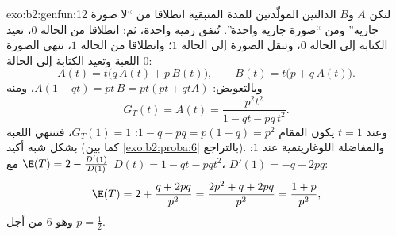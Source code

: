 \begin{solution}{exo:b2:genfun:12}
لتكن $A$ و$B$ الدالتين المولّدتين للمدة المتبقية انطلاقا من
``لا صورة جارية'' ومن ``صورة جارية واحدة''. تُنفق رمية واحدة، ثم:
انطلاقا من الحالة $0$، تعيد الكتابة إلى الحالة $0$، وتنقل
الصورة إلى الحالة $1$؛ وانطلاقا من الحالة $1$، تنهي الصورة
اللعبة وتعيد الكتابة إلى الحالة $0$:
\[
A(t) = t\bigl(q\,A(t) + p\,B(t)\bigr),
\qquad
B(t) = t\bigl(p + q\,A(t)\bigr).
\]
وبالتعويض: $A(1 - qt) = pt\,B = pt(pt + qtA)$، ومنه
\[
G_T(t) = A(t) = \frac{p^2t^2}{1 - qt - pq\,t^2} .
\]
وعند $t = 1$ يكون المقام $1 - q - pq = p(1 - q) = p^2$: $G_T(1) = 1$، فتنتهي اللعبة بشكل شبه
أكيد (كما بين \cref{exo:b2:proba:6} بالتراجع). والمفاضلة اللوغاريتمية عند $1$:
$\E(T) = 2 - \frac{D'(1)}{D(1)}$ مع $D(t) = 1 - qt - pqt^2$، $D'(1) = -q - 2pq$:
\[
\E(T) = 2 + \frac{q + 2pq}{p^2} = \frac{2p^2 + q + 2pq}{p^2}
= \frac{1 + p}{p^2},
\]
وهو $6$ من أجل $p = \frac12$.
\end{solution}

